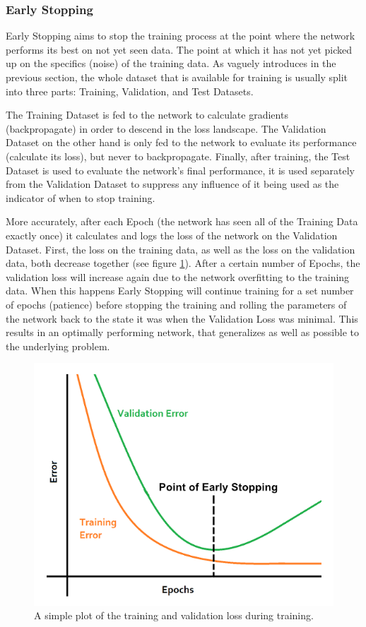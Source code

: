 \documentclass[a4paper,10pt]{scrartcl}
\begin{document}
\subsubsection*{Early Stopping}
\label{earlystopping}

Early Stopping aims to stop the training process at the point where the network performs its best on not yet seen data.
The point at which it has not yet picked up on the specifics (noise) of the training data.
As vaguely introduces in the previous section, the whole dataset that is available for training is usually split into three parts: Training, Validation, and Test Datasets.

The Training Dataset is fed to the network to calculate gradients (backpropagate) in order to descend in the loss landscape.
The Validation Dataset on the other hand is only fed to the network to evaluate its performance (calculate its loss), but never to backpropagate.
Finally, after training, the Test Dataset is used to evaluate the network's final performance, it is used separately from the Validation Dataset to suppress any influence of it being used as the indicator of when to stop training.

More accurately, after each Epoch (the network has seen all of the Training Data exactly once) it calculates and logs the loss of the network on the Validation Dataset.
First, the loss on the training data, as well as the loss on the validation data, both decrease together (see figure \ref{fig:earlystopping}).
After a certain number of Epochs, the validation loss will increase again due to the network overfitting to the training data.
When this happens Early Stopping will continue training for a set number of epochs (patience) before stopping the training and rolling the parameters of the network back to the state it was when the Validation Loss was minimal.
This results in an optimally performing network, that generalizes as well as possible to the underlying problem.

\begin{figure}[h]
    \includegraphics[scale=0.4]{images/early-stopping.png}
    \centering
    \caption{A simple plot of the training and validation loss during training.}
    \label{fig:earlystopping}
\end{figure}
\end{document}
